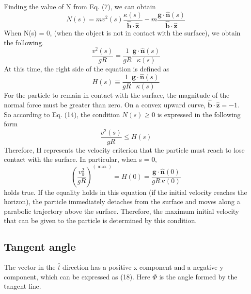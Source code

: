 \documentclass[11pt,letterpaper]{article}
\begin{document}
Finding the value of N from Eq. (7), we can obtain \begin{equation}
N(s)
=
mv^2(s)\frac{\kappa(s)}{\hat{\mathbf b}\cdot\hat{\mathbf z}}
-
m\frac{\mathbf g\cdot\hat{\mathbf n}(s)}
{\hat{\mathbf b}\cdot\hat{\mathbf z}}
\tag{12}
\end{equation} When N(s) = 0, (when the object is not in contact with the surface), we obtain the following. \begin{equation}
\frac{v^2(s)}{gR}
=
\frac{1}{gR}
\frac{\mathbf g\cdot\hat{\mathbf n}(s)}
{\kappa(s)}
\tag{13}
\end{equation} At this time, the right side of the equation is defined as\begin{equation}
H(s)
\equiv
\frac{1}{gR}
\frac{\mathbf g\cdot\hat{\mathbf n}(s)}
{\kappa(s)}
\tag{14}
\end{equation} 
For the particle to remain in contact with the surface, the magnitude of the normal force must be greater than zero. On a convex upward curve, $\hat{\mathbf b}\cdot\hat{\mathbf z}=-1$.
So according to Eq. (14), the condition $N(s)\ge0$ is expressed in the following form \begin{equation}
\frac{v^2(s)}{gR}
\le
H(s)
\tag{15}
\end{equation}
Therefore, H represents the velocity criterion that the particle must reach to lose contact with the surface. In particular, when s = 0,\begin{equation}
\left(
\frac{v_0^2}{gR}
\right)^{(\max)}
=
H(0)
=
\frac{\mathbf g\cdot\hat{\mathbf n}(0)}
{gR\,\kappa(0)}
\tag{16}
\end{equation} holds true. If the equality holds in this equation (if the initial velocity reaches the horizon), the particle immediately detaches from the surface and moves along a parabolic trajectory above the surface. Therefore, the maximum initial velocity that can be given to the particle is determined by this condition.

\subsection{Tangent angle}

The vector in the $\hat{t}$ direction has a positive x-component and a negative y-component, which can be expressed as (18). Here $\Phi$ is the angle formed by the tangent line.
\end{document}
